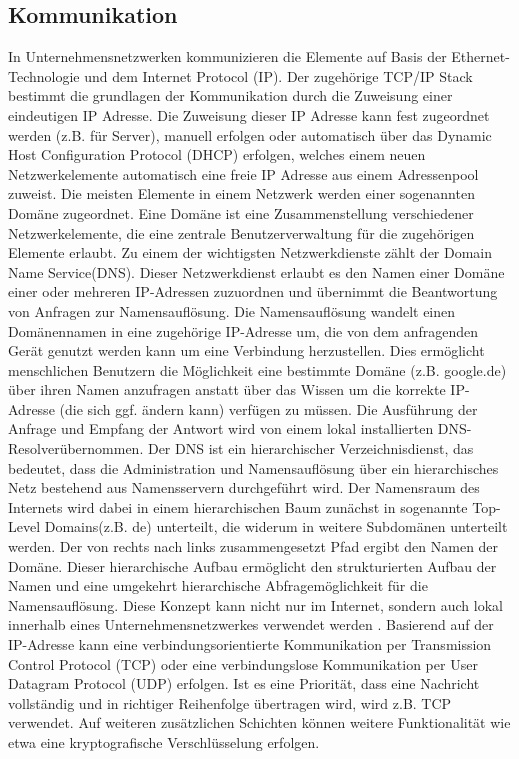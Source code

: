 \subsection{Kommunikation}
In Unternehmensnetzwerken kommunizieren die Elemente auf Basis der Ethernet-Technologie und dem Internet Protocol (IP). Der zugehörige TCP/IP Stack bestimmt die grundlagen der Kommunikation durch die Zuweisung einer eindeutigen IP Adresse. Die Zuweisung dieser IP Adresse kann fest zugeordnet werden (z.B. für Server), manuell erfolgen oder automatisch über das Dynamic Host Configuration Protocol (DHCP) erfolgen, welches einem neuen Netzwerkelemente automatisch eine freie IP Adresse aus einem Adressenpool zuweist. Die meisten Elemente in einem Netzwerk werden einer sogenannten Domäne zugeordnet. Eine Domäne ist eine Zusammenstellung verschiedener Netzwerkelemente, die eine zentrale Benutzerverwaltung für die zugehörigen Elemente erlaubt. 
Zu einem der wichtigsten Netzwerkdienste zählt der \glqq Domain Name Service\grqq  (DNS). Dieser Netzwerkdienst erlaubt es den Namen einer Domäne einer oder mehreren IP-Adressen zuzuordnen und übernimmt die Beantwortung von Anfragen zur Namensauflösung. Die Namensauflösung wandelt einen Domänennamen in eine zugehörige IP-Adresse um, die von dem anfragenden Gerät genutzt werden kann um eine Verbindung herzustellen. Dies ermöglicht menschlichen Benutzern die Möglichkeit eine bestimmte Domäne (z.B. \glqq google.de\grqq ) über ihren Namen anzufragen anstatt über das Wissen um die korrekte IP-Adresse (die sich ggf. ändern kann) verfügen zu müssen. Die Ausführung der Anfrage und Empfang der Antwort wird von einem lokal installierten \glqq DNS-Resolver\grqq  übernommen. Der DNS ist ein hierarchischer Verzeichnisdienst, das bedeutet, dass die Administration und Namensauflösung über ein hierarchisches Netz bestehend aus Namensservern durchgeführt wird. Der Namensraum des Internets wird dabei in einem hierarchischen Baum zunächst in sogenannte \glqq Top-Level Domains\grqq  (z.B. \glqq de\grqq ) unterteilt, die widerum in weitere Subdomänen unterteilt werden. Der von rechts nach links zusammengesetzt Pfad ergibt den Namen der Domäne. Dieser hierarchische Aufbau ermöglicht den strukturierten Aufbau der Namen und eine umgekehrt hierarchische Abfragemöglichkeit für die Namensauflösung. Diese Konzept kann nicht nur im Internet, sondern auch lokal innerhalb eines Unternehmensnetzwerkes verwendet werden \citep{DNS1}.
Basierend auf der IP-Adresse kann eine verbindungsorientierte Kommunikation per Transmission Control Protocol (TCP) oder eine verbindungslose Kommunikation per User Datagram Protocol (UDP) erfolgen.  Ist es eine Priorität, dass eine Nachricht vollständig und in richtiger Reihenfolge übertragen wird, wird z.B. TCP verwendet. Auf weiteren zusätzlichen Schichten können weitere Funktionalität wie etwa eine kryptografische Verschlüsselung erfolgen. 
